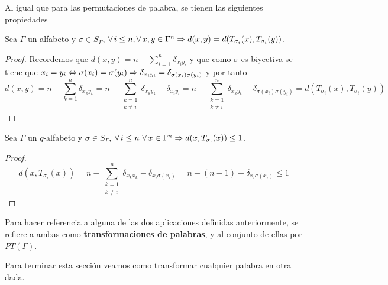 Al igual que para las permutaciones de palabra, se tienen las siguientes propiedades

\begin{lemma}
	\label{res:transmutacion-igualdad-distancia}
	Sea $\Gamma$ un alfabeto y $\sigma\in S_\Gamma$, $\forall i\leq n, \forall x,y\in\Gamma^n\so d(x, y) = d(T_{\sigma_i}(x), T_{\sigma_i}(y))$.
\end{lemma}
\begin{proof}
	Recordemos que $d(x, y) = n-\sum_{i=1}^n \delta_{x_i y_i}$ y que como $\sigma$ es biyectiva se tiene que $x_i=y_i\Leftrightarrow \sigma(x_i) = \sigma(y_i)\Rightarrow \delta_{x_i y_i}=\delta_{\sigma(x_i) \sigma(y_i)}$ y por tanto
	\[
		d(x, y) = n-\sum_{k=1}^n \delta_{x_k y_k}=n-\sum_{\substack{k=1\\k\neq i}}^n \delta_{x_k y_k}-\delta_{x_i y_i}=n-\sum_{\substack{k=1\\k\neq i}}^n \delta_{x_k y_k}-\delta_{\sigma(x_i) \sigma(y_i)}=d(T_{\sigma_i}(x), T_{\sigma_i}(y))
	\]
\end{proof}

\begin{lemma}
	Sea $\Gamma$ un $q$-alfabeto y $\sigma\in S_\Gamma$, $\forall i\leq n\ \forall x\in\Gamma^n\so d(x, T_{\sigma_i}(x))\leq 1$.
\end{lemma}
\begin{proof}
	\[
		d(x, T_{\sigma_i}(x)) = n-\sum_{\substack{k=1\\k\neq i}}^n\delta_{x_k x_k}- \delta_{x_i \sigma(x_i)}=n-(n-1)-\delta_{x_i \sigma(x_i)}\leq 1
	\]
\end{proof}

Para hacer referencia a alguna de las dos aplicaciones definidas anteriormente, se refiere a ambas como \textbf{transformaciones de palabras}, y al conjunto de ellas por $PT(\Gamma)$.

Para terminar esta sección veamos como transformar cualquier palabra en otra dada.

